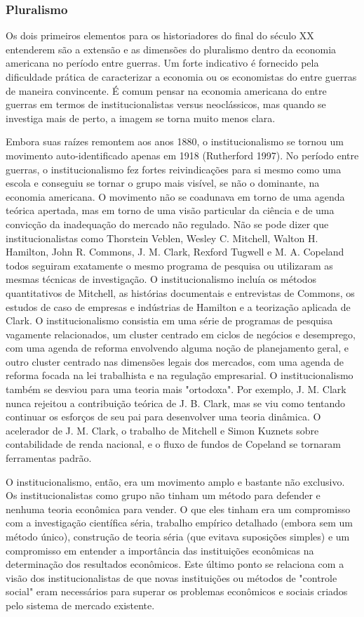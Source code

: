 \documentclass[12pt]{article}
\begin{document}
\subsubsection{\textbf{Pluralismo}}

Os dois primeiros elementos para os historiadores do final do século XX entenderem são a extensão e as dimensões do pluralismo dentro da economia americana no período entre guerras. Um forte indicativo é fornecido pela dificuldade prática de caracterizar a economia ou os economistas do entre guerras de maneira convincente. É comum pensar na economia americana do entre guerras em termos de institucionalistas versus neoclássicos, mas quando se investiga mais de perto, a imagem se torna muito menos clara.

Embora suas raízes remontem aos anos 1880, o institucionalismo se tornou um movimento auto-identificado apenas em 1918 (Rutherford 1997). No período entre guerras, o institucionalismo fez fortes reivindicações para si mesmo como uma escola e conseguiu se tornar o grupo mais visível, se não o dominante, na economia americana. O movimento não se coadunava em torno de uma agenda teórica apertada, mas em torno de uma visão particular da ciência e de uma convicção da inadequação do mercado não regulado. Não se pode dizer que institucionalistas como Thorstein Veblen, Wesley C. Mitchell, Walton H. Hamilton, John R. Commons, J. M. Clark, Rexford Tugwell e M. A. Copeland todos seguiram exatamente o mesmo programa de pesquisa ou utilizaram as mesmas técnicas de investigação. O institucionalismo incluía os métodos quantitativos de Mitchell, as histórias documentais e entrevistas de Commons, os estudos de caso de empresas e indústrias de Hamilton e a teorização aplicada de Clark. O institucionalismo consistia em uma série de programas de pesquisa vagamente relacionados, um cluster centrado em ciclos de negócios e desemprego, com uma agenda de reforma envolvendo alguma noção de planejamento geral, e outro cluster centrado nas dimensões legais dos mercados, com uma agenda de reforma focada na lei trabalhista e na regulação empresarial. O institucionalismo também se desviou para uma teoria mais "ortodoxa". Por exemplo, J. M. Clark nunca rejeitou a contribuição teórica de J. B. Clark, mas se viu como tentando continuar os esforços de seu pai para desenvolver uma teoria dinâmica. O acelerador de J. M. Clark, o trabalho de Mitchell e Simon Kuznets sobre contabilidade de renda nacional, e o fluxo de fundos de Copeland se tornaram ferramentas padrão.

O institucionalismo, então, era um movimento amplo e bastante não exclusivo. Os institucionalistas como grupo não tinham um método para defender e nenhuma teoria econômica para vender. O que eles tinham era um compromisso com a investigação científica séria, trabalho empírico detalhado (embora sem um método único), construção de teoria séria (que evitava suposições simples) e um compromisso em entender a importância das instituições econômicas na determinação dos resultados econômicos. Este último ponto se relaciona com a visão dos institucionalistas de que novas instituições ou métodos de "controle social" eram necessários para superar os problemas econômicos e sociais criados pelo sistema de mercado existente.
\end{document}
